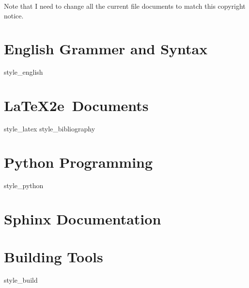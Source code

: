 \documentclass[twoside]{book}
\begin{document}
Note that I need to change all the current file documents to match
this copyright notice.


\chapter{English Grammer and Syntax}
{style_english}

\chapter{\LaTeX2e\ Documents}
{style_latex}
{style_bibliography}

\chapter{Python Programming}
{style_python}

\chapter{Sphinx Documentation}

\chapter{Building Tools}
{style_build}

\printbibliography


\backmatter
\end{document}
